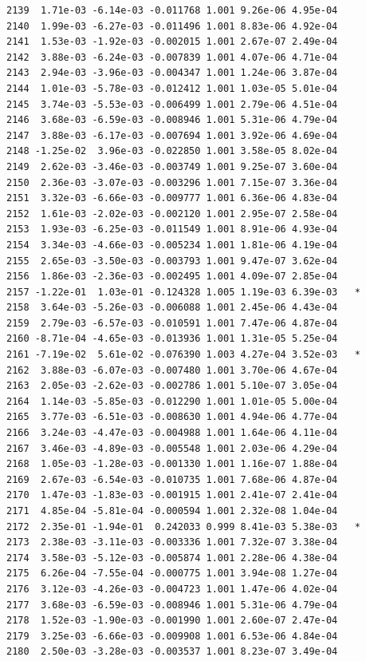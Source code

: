 \documentclass[
  letterpaper,
  DIV=11,
  numbers=noendperiod]{scrartcl}
\begin{document}
\begin{verbatim}
2139  1.71e-03 -6.14e-03 -0.011768 1.001 9.26e-06 4.95e-04    
2140  1.99e-03 -6.27e-03 -0.011496 1.001 8.83e-06 4.92e-04    
2141  1.53e-03 -1.92e-03 -0.002015 1.001 2.67e-07 2.49e-04    
2142  3.88e-03 -6.24e-03 -0.007839 1.001 4.07e-06 4.71e-04    
2143  2.94e-03 -3.96e-03 -0.004347 1.001 1.24e-06 3.87e-04    
2144  1.01e-03 -5.78e-03 -0.012412 1.001 1.03e-05 5.01e-04    
2145  3.74e-03 -5.53e-03 -0.006499 1.001 2.79e-06 4.51e-04    
2146  3.68e-03 -6.59e-03 -0.008946 1.001 5.31e-06 4.79e-04    
2147  3.88e-03 -6.17e-03 -0.007694 1.001 3.92e-06 4.69e-04    
2148 -1.25e-02  3.96e-03 -0.022850 1.001 3.58e-05 8.02e-04    
2149  2.62e-03 -3.46e-03 -0.003749 1.001 9.25e-07 3.60e-04    
2150  2.36e-03 -3.07e-03 -0.003296 1.001 7.15e-07 3.36e-04    
2151  3.32e-03 -6.66e-03 -0.009777 1.001 6.36e-06 4.83e-04    
2152  1.61e-03 -2.02e-03 -0.002120 1.001 2.95e-07 2.58e-04    
2153  1.93e-03 -6.25e-03 -0.011549 1.001 8.91e-06 4.93e-04    
2154  3.34e-03 -4.66e-03 -0.005234 1.001 1.81e-06 4.19e-04    
2155  2.65e-03 -3.50e-03 -0.003793 1.001 9.47e-07 3.62e-04    
2156  1.86e-03 -2.36e-03 -0.002495 1.001 4.09e-07 2.85e-04    
2157 -1.22e-01  1.03e-01 -0.124328 1.005 1.19e-03 6.39e-03   *
2158  3.64e-03 -5.26e-03 -0.006088 1.001 2.45e-06 4.43e-04    
2159  2.79e-03 -6.57e-03 -0.010591 1.001 7.47e-06 4.87e-04    
2160 -8.71e-04 -4.65e-03 -0.013936 1.001 1.31e-05 5.25e-04    
2161 -7.19e-02  5.61e-02 -0.076390 1.003 4.27e-04 3.52e-03   *
2162  3.88e-03 -6.07e-03 -0.007480 1.001 3.70e-06 4.67e-04    
2163  2.05e-03 -2.62e-03 -0.002786 1.001 5.10e-07 3.05e-04    
2164  1.14e-03 -5.85e-03 -0.012290 1.001 1.01e-05 5.00e-04    
2165  3.77e-03 -6.51e-03 -0.008630 1.001 4.94e-06 4.77e-04    
2166  3.24e-03 -4.47e-03 -0.004988 1.001 1.64e-06 4.11e-04    
2167  3.46e-03 -4.89e-03 -0.005548 1.001 2.03e-06 4.29e-04    
2168  1.05e-03 -1.28e-03 -0.001330 1.001 1.16e-07 1.88e-04    
2169  2.67e-03 -6.54e-03 -0.010735 1.001 7.68e-06 4.87e-04    
2170  1.47e-03 -1.83e-03 -0.001915 1.001 2.41e-07 2.41e-04    
2171  4.85e-04 -5.81e-04 -0.000594 1.001 2.32e-08 1.04e-04    
2172  2.35e-01 -1.94e-01  0.242033 0.999 8.41e-03 5.38e-03   *
2173  2.38e-03 -3.11e-03 -0.003336 1.001 7.32e-07 3.38e-04    
2174  3.58e-03 -5.12e-03 -0.005874 1.001 2.28e-06 4.38e-04    
2175  6.26e-04 -7.55e-04 -0.000775 1.001 3.94e-08 1.27e-04    
2176  3.12e-03 -4.26e-03 -0.004723 1.001 1.47e-06 4.02e-04    
2177  3.68e-03 -6.59e-03 -0.008946 1.001 5.31e-06 4.79e-04    
2178  1.52e-03 -1.90e-03 -0.001990 1.001 2.60e-07 2.47e-04    
2179  3.25e-03 -6.66e-03 -0.009908 1.001 6.53e-06 4.84e-04    
2180  2.50e-03 -3.28e-03 -0.003537 1.001 8.23e-07 3.49e-04    

\end{verbatim}
\end{document}
